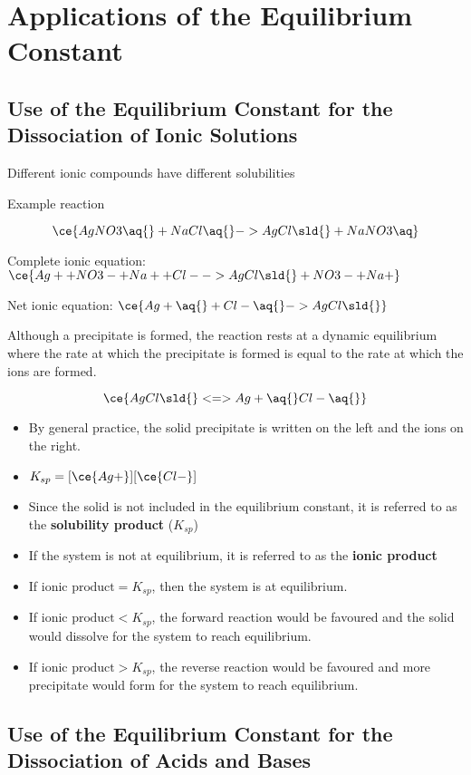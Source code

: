 \section{Applications of the Equilibrium Constant} \label{12/11/2024}
	\subsection{Use of the Equilibrium Constant for the Dissociation of Ionic Solutions}
		Different ionic compounds have different solubilities

		Example reaction

		$$\ce{AgNO3 \aq{} + NaCl \aq{} -> AgCl \sld{} + NaNO3 \aq}$$

		Complete ionic equation: $\ce{Ag+ + NO3- +Na+ + Cl- -> AgCl \sld{} + NO3- + Na+}$

		Net ionic equation: $\ce{Ag+ \aq{} + Cl- \aq{} -> AgCl \sld{}}$

		Although a precipitate is formed, the reaction rests at a dynamic equilibrium where the rate at which the precipitate is formed is equal to the rate at which the ions are formed.

		$$\ce{AgCl \sld{} <=> Ag+ \aq{} Cl- \aq{}}$$

		\begin{itemize}
			\item By general practice, the solid precipitate is written on the left and the ions on the right.
			\item $K_{sp} = [\ce{Ag+}][\ce{Cl-}]$
			\item Since the solid is not included in the equilibrium constant, it is referred to as the \textbf{solubility product} ($K_{sp}$)
			\item If the system is not at equilibrium, it is referred to as the \textbf{ionic product}
			\item If $\text{ionic product} = K_{sp}$, then the system is at equilibrium.
			\item If $\text{ionic product} < K_{sp}$, the forward reaction would be favoured and the solid would dissolve for the system to reach equilibrium.
			\item If $\text{ionic product} > K_{sp}$, the reverse reaction would be favoured and more precipitate would form for the system to reach equilibrium.
		\end{itemize}

	\subsection{Use of the Equilibrium Constant for the Dissociation of Acids and Bases}
